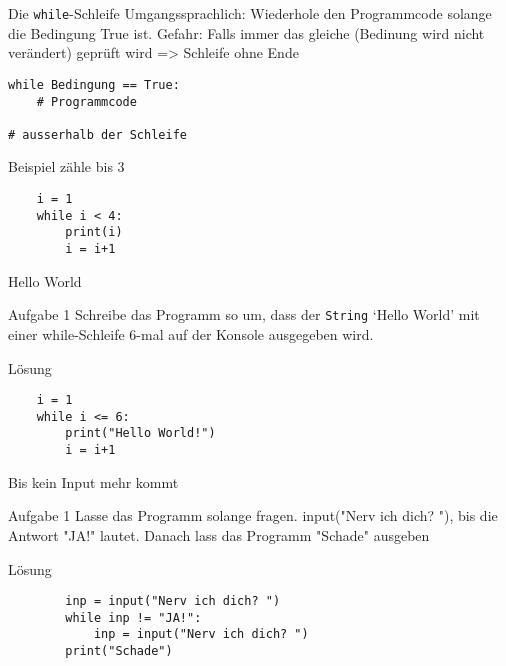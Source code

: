 \begin{frame}[fragile]{Die \texttt{while}-Schleife}
	Umgangssprachlich: Wiederhole den Programmcode solange die Bedingung True ist.
	Gefahr: Falls immer das gleiche (Bedinung wird nicht verändert) geprüft wird => Schleife ohne Ende

    \begin{lstlisting}
while Bedingung == True:
    # Programmcode

# ausserhalb der Schleife
    \end{lstlisting}
    
    Beispiel zähle bis 3
    \begin{lstlisting}
    i = 1
    while i < 4:
    	print(i)
    	i = i+1   
    \end{lstlisting}
   
\end{frame}

\begin{frame}[fragile]{Hello World}
\begin{block}{Aufgabe 1}
	Schreibe das Programm so um, dass der \texttt{String} `Hello World' mit einer while-Schleife 6-mal auf der Konsole ausgegeben wird.
\end{block}
\pause{}
\begin{exampleblock}{Lösung}
	\begin{lstlisting}		 
	i = 1
	while i <= 6:
		print("Hello World!")
		i = i+1   		
	\end{lstlisting}
\end{exampleblock}
\end{frame}

\begin{frame}[fragile]{Bis kein Input mehr kommt}
\begin{block}{Aufgabe 1}
	Lasse das Programm solange fragen. input("Nerv ich dich? "), bis die Antwort "JA!" lautet. Danach lass das Programm "Schade" ausgeben
\end{block}
\pause{}
\begin{exampleblock}{Lösung}
	\begin{lstlisting}		 
		inp = input("Nerv ich dich? ")
		while inp != "JA!":
			inp = input("Nerv ich dich? ")
		print("Schade")	
	\end{lstlisting}
\end{exampleblock}
\end{frame}




